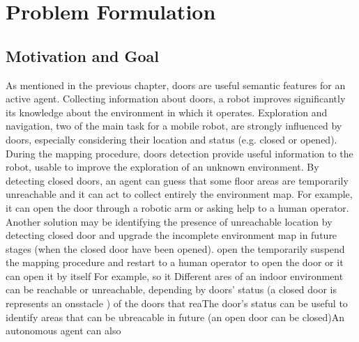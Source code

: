 \chapter{Problem Formulation}
\label{capitolo3}
\thispagestyle{empty}

\section{Motivation and Goal}

As mentioned in the previous chapter, doors are useful semantic features for an active agent. Collecting information about doors, a robot improves significantly its knowledge about the environment in which it operates. Exploration and navigation, two of the main task for a mobile robot, are strongly influenced by doors, especially considering their location and status (e.g. closed or opened). During the mapping procedure, doors detection provide useful information to the robot, usable to improve the exploration of an unknown environment. By detecting closed doors, an agent can guess that some floor areas are temporarily unreachable and it can act to collect entirely the environment map. For example, it can open the door through a robotic arm or asking help to a human operator. Another solution may be identifying the presence of unreachable location by detecting closed door and upgrade the incomplete environment map in future stages (when the closed door have been opened). open the temporarily suspend the mapping procedure and restart to a human operator to open the door or it can open it by itself  For example,  so it  Different ares of an indoor environment can be reachable or unreachable, depending by doors' status (a closed door is represents an onsstacle ) of the doors that  reaThe door's status can be useful to identify areas that can be ubreacable in future (an open door can be closed)An autonomous agent can also 